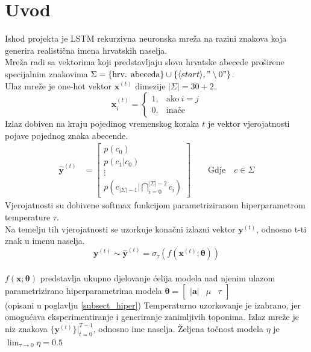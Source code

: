 \documentclass[conference]{IEEEtran}
\begin{document}
\section{Uvod}
\label{sect:intro}
Ishod projekta je LSTM rekurzivna neuronska mreža na razini znakova koja generira realistična imena hrvatskih naselja.\\
Mreža radi sa vektorima koji predstavljaju slova hrvatske abecede proširene specijalnim znakovima $\Sigma = \{ \text{hrv. abeceda}\} \cup \{\langle start \rangle, "\setminus 0"\}$.\\
Ulaz mreže je one-hot vektor $\mathbf{x}^{(t)}$ dimezije $\lvert \Sigma \rvert = 30 + 2$.
\begin{equation}
\mathbf{x}^{(t)}_i=
    \begin{cases}
      1, & \text{ako}\ i=j \\
      0, & \text{inače}
    \end{cases}
\end{equation}
Izlaz dobiven na kraju pojedinog vremenskog koraka $t$ je vektor vjerojatnosti pojave pojednog znaka abecende.\\
\begin{align}
    \hat{\mathbf{y}}^{(t)} &= \begin{bmatrix}
           p(c_0) \\
           p(c_1 | c_0) \\
           \vdots \\
           p(c_{\lvert \Sigma \rvert -1} | \bigcap_{i=0}^{\lvert \Sigma \rvert -2} c_i)
         \end{bmatrix}
         \quad \quad \text{Gdje} \quad c \in \Sigma
\end{align}
Vjerojatnosti su dobivene softmax funkcijom parametriziranom hiperparametrom temperature $\tau$.\\
Na temelju tih vjerojatnosti se uzorkuje konačni izlazni vektor $\mathbf{y}^{(t)}$, odnosno t-ti znak u imenu naselja.\\
\begin{equation}
 \mathbf{y}^{(t)} \sim \hat{\mathbf{y}}^{(t)} = \sigma_{\tau}(f(\mathbf{x}^{(t)} ; \boldsymbol{\theta}))
\end{equation}
\ \\
$f(\mathbf{x} ; \boldsymbol{\theta})$ predstavlja ukupno djelovanje ćelija modela nad njenim ulazom parametrizirano hiperparametrima modela $\boldsymbol{\theta} = \begin{bmatrix} \lvert \mathbf{a} \rvert & \mu & \tau \end{bmatrix}$\\ (opisani u poglavlju \ref{subsect_hiper})
Temperaturno uzorkovanje je izabrano, jer omogućava eksperimentiranje i generiranje zanimljivih toponima.
Izlaz mreže je niz znakova $\{\mathbf{y}^{(t)}\} \biggr \rvert_{t=0}^{T-1}$, odnosno ime naselja.
Željena točnost modela $\eta$ je $\lim_{\tau \to 0} \eta = 0.5$
\end{document}
